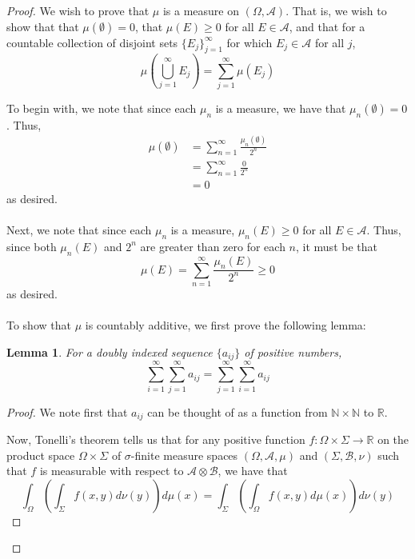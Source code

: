 \documentclass[fontsize=11pt]{scrartcl} %
\numberwithin{equation}{section} %
\numberwithin{figure}{section} %
\numberwithin{table}{section} %
\newcommand{\R}{\mathbb{R}}
\newcommand{\N}{\mathbb{N}}
\newtheorem*{lemma}{Lemma}
\begin{document}
\begin{proof}
    We wish to prove that $\mu$ is a measure on $(\Omega,\mathscr{A})$. That is,
    we wish to show that that $\mu(\emptyset) = 0$, that $\mu(E)\geq 0$ for all
    $E\in\mathscr{A}$, and that for a countable collection of disjoint sets
    $\{E_j\}_{j=1}^{\infty}$ for which $E_j\in\mathscr{A}$ for all $j$,
    \[
        \mu\left(\bigcup_{j=1}^{\infty}E_j\right) = \sum_{j=1}^{\infty}\mu(E_j)
    \]

    To begin with, we note that since each $\mu_n$ is a measure, we have that
    $\mu_n(\emptyset) = 0$.
    Thus,
    \[
        \begin{aligned}
            \mu(\emptyset)  &= \sum_{n=1}^{\infty}\frac{\mu_n(\emptyset)}{2^n}\\
                            &= \sum_{n=1}^{\infty}\frac{0}{2^n}\\
                            &=0
        \end{aligned}
    \]
    as desired.
    \\
    \\
    Next, we note that since each $\mu_n$ is a measure, $\mu_n(E)\geq 0$ for all
    $E\in\mathscr{A}$. Thus, since both $\mu_n(E)$ and $2^n$ are greater than
    zero for each $n$, it must be that 
    \[
        \mu(E) = \sum_{n=1}^{\infty}\frac{\mu_n(E)}{2^n} \geq 0
    \]
    as desired.
    \\
    \\
    To show that $\mu$ is countably additive, we first prove the following lemma:
    \begin{lemma}
        For a doubly indexed sequence $\{a_{ij}\}$ of positive numbers,
        \[
            \sum_{i=1}^{\infty}\sum_{j=1}^{\infty}a_{ij} =
            \sum_{j=1}^{\infty}\sum_{i=1}^{\infty}a_{ij}
        \]
    \end{lemma}
    \begin{proof}
        We note first that $a_{ij}$ can be thought of as a function from
        $\N\times \N$ to $\R$. 
        
        Now, Tonelli's theorem tells us that for any positive function
        $f:\Omega\times\Sigma\to\R$ on the product space $\Omega\times\Sigma$
        of $\sigma$-finite measure spaces $(\Omega,\mathscr{A},\mu)$ and
        $(\Sigma,\mathscr{B},\nu)$ such that $f$ is measurable with respect to
        $\mathscr{A}\otimes\mathscr{B}$, we have that
        \[
            \int_{\Omega}\left(\int_{\Sigma}f(x,y)d\nu(y)\right)d\mu(x) =
            \int_{\Sigma}\left(\int_{\Omega}f(x,y)d\mu(x)\right)d\nu(y)
        \]


\end{proof}
\end{proof}
\end{document}
